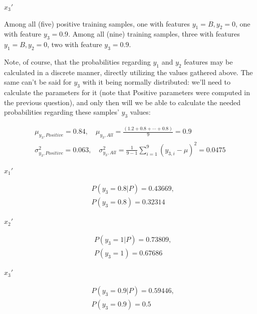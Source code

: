 \documentclass[12pt]{article}
\begin{document}
\begin{enumerate}[leftmargin=\labelsep]
\begin{multicols}{3}
    \columnbreak

    $x_3'$

    Among all (five) positive training samples, one with features $y_1 = B, y_2 = 0$,
    one with feature $y_3 = 0.9$.
    Among all (nine) training samples, three with features $y_1 = B, y_2 = 0$,
    two with feature $y_3 = 0.9$.

  \end{multicols}

  Note, of course, that the probabilities regarding $y_1$ and $y_2$ features may
  be calculated in a discrete manner, directly utilizing the values gathered above.
  The same can't be said for $y_3$ with it being normally distributed:
  we'll need to calculate the parameters for it (note that Positive parameters were computed in the
  previous question), and only then will we be able to calculate the needed probabilities regarding
  these samples' $y_3$ values:

  \begin{align}
    \mu_{y_3, Positive} = 0.84, \quad \mu_{y_3, All} = \frac{(1.2 + 0.8 + \cdots + 0.8)}{9} = 0.9 \\
    \sigma_{y_3, Positive}^2 = 0.063, \quad \sigma_{y_3, All}^2 = \frac{1}{9 - 1} \sum_{i=1}^{9} (y_{3, i} - \mu)^2 = 0.0475
  \end{align}

  \begin{multicols}{3}
    \setlength{\columnseprule}{1pt}
    \def\columnseprulecolor{\color{black}}
    \centering

    $x_1'$

    $$
    \begin{aligned}
      &P(y_3 = 0.8 | P) = 0.43669, \\
      &P(y_3 = 0.8) = 0.32314
    \end{aligned}
    $$

    \columnbreak

    $x_2'$

    $$
    \begin{aligned}
      &P(y_3 = 1 | P) = 0.73809, \\
      &P(y_3 = 1) = 0.67686
    \end{aligned}
    $$

    \columnbreak

    $x_3'$

    $$
    \begin{aligned}
      &P(y_3 = 0.9 | P) = 0.59446, \\
      &P(y_3 = 0.9) = 0.5
    \end{aligned}
    $$


\end{multicols}
\end{enumerate}
\end{document}
